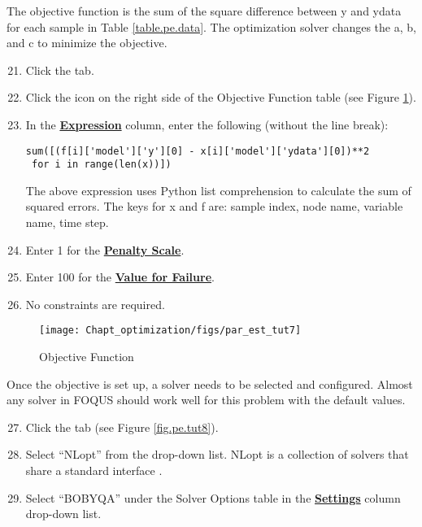 The objective function is the sum of the square difference between y and ydata for each sample in Table \ref{table.pe.data}. The optimization solver changes the a, b, and c to minimize the objective.

\begin{enumerate}
	\setcounter{enumi}{20}
	\item Click the  tab.
	\item Click the  icon on the right side of the Objective Function table  (see Figure \ref{fig.pe.tut7}).
	\item In the \textbf{\underline{Expression}} column, enter the following (without the line break):
	\begin{small}
	\begin{verbatim}
sum([(f[i]['model']['y'][0] - x[i]['model']['ydata'][0])**2
 for i in range(len(x))])
	\end{verbatim}
	\end{small}
	The above expression uses Python list comprehension to calculate the sum of squared errors. The keys for x and f are: sample index, node name, variable name, time step.
	\item Enter 1 for the \textbf{\underline{Penalty Scale}}.
	\item Enter 100 for the \textbf{\underline{Value for Failure}}.
	\item No constraints are required.
\end{enumerate}

\begin{figure}[H]
	\begin{center}
		\texttt{[image: Chapt\_optimization/figs/par\_est\_tut7]}
		\caption{Objective Function}
		\label{fig.pe.tut7}
	\end{center}
\end{figure}

Once the objective is set up, a solver needs to be selected and configured. Almost any solver in FOQUS should work well for this problem with the default values.

\begin{enumerate}
	\setcounter{enumi}{26}
	\item Click the  tab (see Figure \ref{fig.pe.tut8}).
	\item Select ``NLopt'' from the  drop-down list. NLopt is a collection of solvers that share a standard interface \citep{Johnson_2015}.
	\item Select ``BOBYQA'' under the Solver Options table in the \textbf{\underline{Settings}} column drop-down list.
\end{enumerate}

